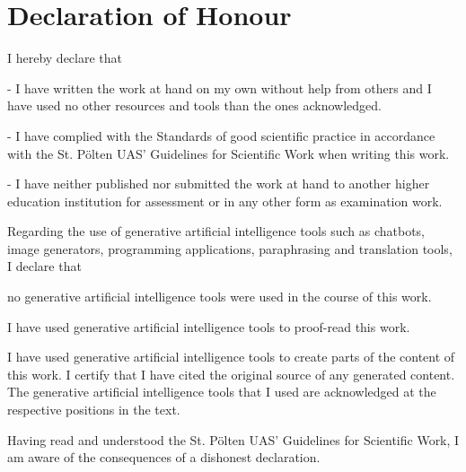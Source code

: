 \chapter*{Declaration of Honour}
\label{ch:declaration}

\begin{flushleft}
I hereby declare that
\end{flushleft}

\begin{flushleft}
- I have written the work at hand on my own without help from others and I have used no other resources and tools than the ones acknowledged.
\end{flushleft}

\begin{flushleft}
- I have complied with the Standards of good scientific practice in accordance with the St. Pölten UAS’ Guidelines for Scientific Work when writing this work.
\end{flushleft}

\begin{flushleft}
- I have neither published nor submitted the work at hand to another higher education institution for assessment or in any other form as examination work.
\end{flushleft}

Regarding the use of generative artificial intelligence tools such as chatbots, image generators, programming applications, paraphrasing and translation tools, I declare that 


\begin{todolist}
    \item no generative artificial intelligence tools were used in the course of this work.
    \item[\done] I have used generative artificial intelligence tools to proof-read this work. 
    \item I have used generative artificial intelligence tools to create parts of the content of this work. I certify that I have cited the original source of any generated content. The generative artificial intelligence tools that I used are acknowledged at the respective positions in the text.
\end{todolist}

Having read and understood the St. Pölten UAS' Guidelines for Scientific Work, I am aware of the consequences of a dishonest declaration.

\vspace{1.5cm}


